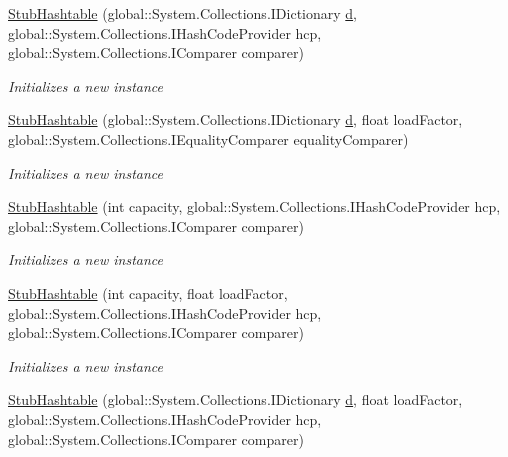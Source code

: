\begin{DoxyCompactItemize}
\hyperlink{class_system_1_1_collections_1_1_fakes_1_1_stub_hashtable_a6b6c7c6bf9d4874974071650c116a2e9}{Stub\-Hashtable} (global\-::\-System.\-Collections.\-I\-Dictionary \hyperlink{bootstrap_8min_8js_aeb337d295abaddb5ec3cb34cc2e2bbc9}{d}, global\-::\-System.\-Collections.\-I\-Hash\-Code\-Provider hcp, global\-::\-System.\-Collections.\-I\-Comparer comparer)
\begin{DoxyCompactList}\small\item\em Initializes a new instance\end{DoxyCompactList}\item 
\hyperlink{class_system_1_1_collections_1_1_fakes_1_1_stub_hashtable_aece4a277951d97636a27bb3e45b0ae50}{Stub\-Hashtable} (global\-::\-System.\-Collections.\-I\-Dictionary \hyperlink{bootstrap_8min_8js_aeb337d295abaddb5ec3cb34cc2e2bbc9}{d}, float load\-Factor, global\-::\-System.\-Collections.\-I\-Equality\-Comparer equality\-Comparer)
\begin{DoxyCompactList}\small\item\em Initializes a new instance\end{DoxyCompactList}\item 
\hyperlink{class_system_1_1_collections_1_1_fakes_1_1_stub_hashtable_a7644d9f2b5b0d9ce30e3174acdf2e9e7}{Stub\-Hashtable} (int capacity, global\-::\-System.\-Collections.\-I\-Hash\-Code\-Provider hcp, global\-::\-System.\-Collections.\-I\-Comparer comparer)
\begin{DoxyCompactList}\small\item\em Initializes a new instance\end{DoxyCompactList}\item 
\hyperlink{class_system_1_1_collections_1_1_fakes_1_1_stub_hashtable_ae39f9af98670c206c639a5f374547c57}{Stub\-Hashtable} (int capacity, float load\-Factor, global\-::\-System.\-Collections.\-I\-Hash\-Code\-Provider hcp, global\-::\-System.\-Collections.\-I\-Comparer comparer)
\begin{DoxyCompactList}\small\item\em Initializes a new instance\end{DoxyCompactList}\item 
\hyperlink{class_system_1_1_collections_1_1_fakes_1_1_stub_hashtable_a6846f7a6c1ff9e464cef409d9e9cd8bc}{Stub\-Hashtable} (global\-::\-System.\-Collections.\-I\-Dictionary \hyperlink{bootstrap_8min_8js_aeb337d295abaddb5ec3cb34cc2e2bbc9}{d}, float load\-Factor, global\-::\-System.\-Collections.\-I\-Hash\-Code\-Provider hcp, global\-::\-System.\-Collections.\-I\-Comparer comparer)

\end{DoxyCompactItemize}
